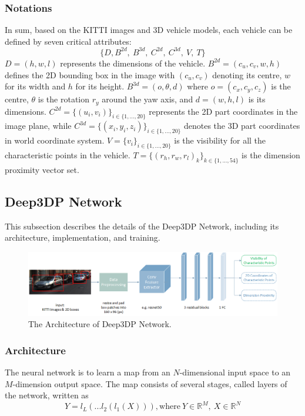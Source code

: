 \documentclass[a4paper,12pt]{article}
\begin{document}
\subsubsection{Notations}
In sum, based on the KITTI images and 3D vehicle models, each vehicle can be defined by seven critical attributes:
\[  \{D, B^{2d}, ~B^{3d}, ~C^{2d}, ~C^{3d}, ~V, ~T\}  \]
$D = (h, w, l)$ represents the dimensions of the vehicle. $B^{2d} = (c_u, c_v, w, h)$ defines the 2D bounding box in the image with $(c_u, c_v)$ denoting its centre,  $w$ for its width and $h$ for its height. $B^{3d} = (o, \theta, d)$ where $o = (c_x, c_y, c_z)$ is the centre, $\theta$ is the rotation $r_y$ around the yaw axis, and $d = (w, h, l)$ is its dimensions. $C^{2d}  = \{(u_i, v_i)\}_{i \in \{1, ...,20\}}$ represents the 2D part coordinates in the image plane, while $C^{3d}  = \{(x_i, y_i, z_i)\}_{i \in \{1, ...,20\}}$ denotes the 3D part coordinates in world coordinate system. $V = \{v_i\}_{i \in \{1, ...,20\}}$ is the visibility for all the characteristic points in the vehicle.  $T = \{{(r_{h},r_{w},r_{l})}_k\}_{k \in \{1, ...,54\}}$ is the dimension proximity vector set.

\subsection{Deep3DP Network}
\label{network}
This subsection describes the details of the Deep3DP Network, including its architecture, implementation, and training.

\begin{figure}[h]		
	\includegraphics[width=1\textwidth]{NN_archi_box_0522.png}
	\caption{The Architecture of Deep3DP Network.}
	\centering
	\label{figure:nn_archi}
\end{figure}

\subsubsection{Architecture}
The neural network is to learn a map from an $N$-dimensional  input space to an $M$-dimension output space. The map consists of several stages, called layers of the network, written as
\begin{equation}
Y = l_L(...l_2(l_1(X))), \text{where} ~Y \in {\mathbb{R}^M}, ~X \in {\mathbb{R}^N}
\end{equation}
\end{document}
